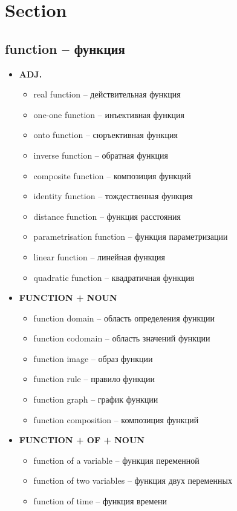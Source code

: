 \documentclass[a4paper, 10pt]{article}
\theoremstyle{definition}
\theoremstyle{plain}
\theoremstyle{remark}
\begin{document}
\section{Section}

\subsection{function – функция}

\begin{itemize}
    \item \textbf{ADJ.}
    \begin{itemize}
        \item real function – действительная функция
        \item one-one function – инъективная функция
        \item onto function – сюръективная функция
        \item inverse function – обратная функция
        \item composite function – композиция функций
        \item identity function – тождественная функция
        \item distance function – функция расстояния
        \item parametrisation function – функция параметризации
        \item linear function – линейная функция
        \item quadratic function – квадратичная функция
    \end{itemize}
    
    \item \textbf{FUNCTION + NOUN}
    \begin{itemize}
        \item function domain – область определения функции
        \item function codomain – область значений функции
        \item function image – образ функции
        \item function rule – правило функции
        \item function graph – график функции
        \item function composition – композиция функций
    \end{itemize}
    
    \item \textbf{FUNCTION + OF + NOUN}
    \begin{itemize}
        \item function of a variable – функция переменной
        \item function of two variables – функция двух переменных
        \item function of time – функция времени
    \end{itemize}
    

\end{itemize}
\end{document}
